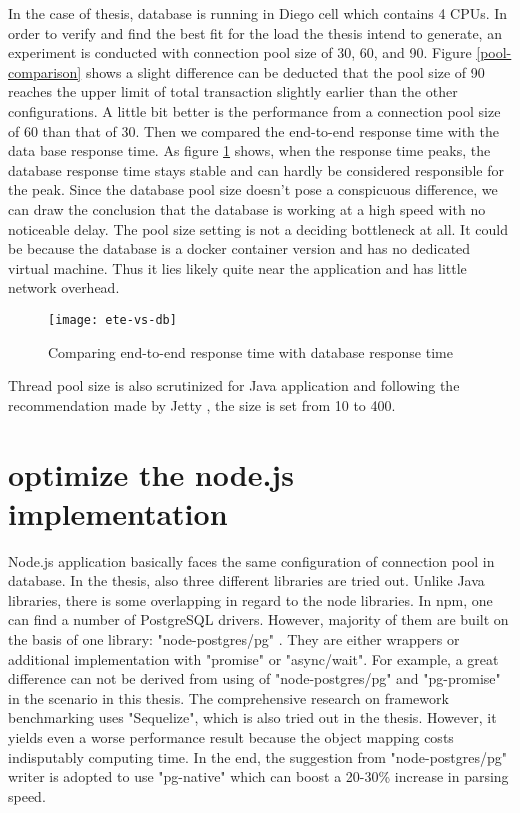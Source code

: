 In the case of thesis, database is running in Diego cell which contains 4 CPUs. In order to verify and find the best fit for the load the thesis intend to generate, an experiment is conducted with connection pool size of 30, 60, and 90.  Figure \ref{pool-comparison} shows a slight difference can be deducted that the pool size of 90 reaches the upper limit of total transaction slightly earlier than the other configurations. A little bit better is the performance from a connection pool size of 60 than that of 30. Then we compared the end-to-end response time with the data base response time.  As figure \ref{ete-vs-db} shows, when the response time peaks, the database response time stays stable and can hardly be considered responsible for the peak. Since the database pool size doesn't pose a conspicuous difference, we can draw the conclusion that the database is working at a high speed with no noticeable delay. The pool size setting is not a deciding bottleneck at all. It could be because the database is a docker container version and has no dedicated virtual machine. Thus it lies likely quite near the application and has little network overhead. 

\begin{figure}[h]
	\centering
	\texttt{[image: ete-vs-db]}
	\caption{Comparing end-to-end response time with database response time}
	\label{ete-vs-db}
\end{figure}

Thread pool size is also scrutinized for Java application and following the recommendation made by Jetty \citep{threadpool}, the size is set from 10 to 400. \\


\section{optimize the node.js implementation}
Node.js application basically faces the same configuration of connection pool in database. In the thesis, also three different libraries are tried out. Unlike Java libraries, there is some overlapping in regard to the node libraries. In npm, one can find a number of PostgreSQL drivers. However, majority of them are built on the basis of one library: "node-postgres/pg" \citep{node-pg}. They are either wrappers or additional implementation with "promise" or "async/wait". For example, a great difference can not be derived from using of "node-postgres/pg" and "pg-promise" in the scenario in this thesis. The comprehensive research on framework benchmarking \citep{Benchmark} uses "Sequelize", which is also tried out in the thesis. However, it yields even a worse performance result because the object mapping costs indisputably computing time. In the end, the suggestion from "node-postgres/pg" writer is adopted to use "pg-native" which can boost a 20-30\% increase in parsing speed.\\




